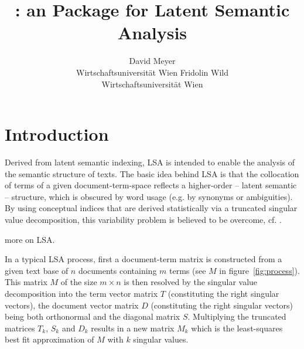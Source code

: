 \documentclass[article]{jss}
\author{David Meyer\\Wirtschaftsuniversit\"at Wien \And 
        Fridolin Wild\\Wirtschaftsuniversit\"at Wien}
\title{\pkg{lsa}: an \proglang{R} Package for Latent Semantic Analysis}
\begin{document}
\section[statistical technique]{Introduction}

  Derived from latent semantic indexing, LSA is intended to enable the 
  analysis of the semantic structure of texts. The basic idea behind LSA 
  is that the collocation of terms of a given document-term-space reflects 
  a higher-order -- latent semantic -- structure, which is obscured by 
  word usage (e.g. by synonyms or ambiguities). By using conceptual indices 
  that are derived statistically via a truncated singular value decomposition, 
  this variability problem is believed to be overcome, cf. \cite{landauer:1990}.
  
  more on LSA.
  
  In a typical LSA process, first a document-term matrix is constructed 
  from a given text base of \begin{math}n\end{math} documents containing 
  \begin{math}m\end{math} terms (see \begin{math}M\end{math} in figure~\ref{fig:process}). 
  This matrix \begin{math}M\end{math} of the size \begin{math}m \times n\end{math} 
  is then resolved by the singular value decomposition into the term vector 
  matrix \begin{math}T\end{math} (constituting the right singular vectors), 
  the document vector matrix \begin{math}D\end{math} (constituting the right 
  singular vectors) being both orthonormal and the diagonal matrix 
  \begin{math}S\end{math}. Multiplying the truncated matrices 
  \begin{math}T_{k}\end{math}, \begin{math}S_{k}\end{math} and 
  \begin{math}D_{k}\end{math} results in a new matrix \begin{math}M_{k}\end{math} 
  which is the least-squares best fit approximation of 
  \begin{math}M\end{math} with \begin{math}k\end{math} singular values.
\end{document}
